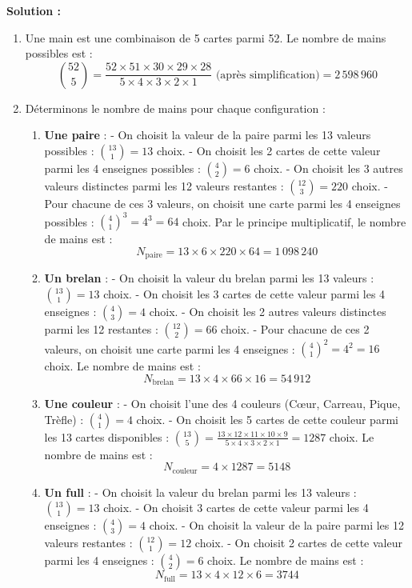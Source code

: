 \textbf{Solution :}
\begin{enumerate}
    \item Une main est une combinaison de 5 cartes parmi 52. Le nombre de mains possibles est :
    \[
    \binom{52}{5} = \frac{52 \times 51 \times 30 \times 29 \times 28}{5 \times 4 \times 3 \times 2 \times 1} \text{ (après simplification)} = 2\,598\,960
    \]
    
    \item Déterminons le nombre de mains pour chaque configuration :
    \begin{enumerate}
        \item \textbf{Une paire} :
        - On choisit la valeur de la paire parmi les 13 valeurs possibles : $\binom{13}{1} = 13$ choix.
        - On choisit les 2 cartes de cette valeur parmi les 4 enseignes possibles : $\binom{4}{2} = 6$ choix.
        - On choisit les 3 autres valeurs distinctes parmi les 12 valeurs restantes : $\binom{12}{3} = 220$ choix.
        - Pour chacune de ces 3 valeurs, on choisit une carte parmi les 4 enseignes possibles : $\binom{4}{1}^3 = 4^3 = 64$ choix.
        Par le principe multiplicatif, le nombre de mains est :
        \[
        N_{\text{paire}} = 13 \times 6 \times 220 \times 64 = 1\,098\,240
        \]
        
        \item \textbf{Un brelan} :
        - On choisit la valeur du brelan parmi les 13 valeurs : $\binom{13}{1} = 13$ choix.
        - On choisit les 3 cartes de cette valeur parmi les 4 enseignes : $\binom{4}{3} = 4$ choix.
        - On choisit les 2 autres valeurs distinctes parmi les 12 restantes : $\binom{12}{2} = 66$ choix.
        - Pour chacune de ces 2 valeurs, on choisit une carte parmi les 4 enseignes : $\binom{4}{1}^2 = 4^2 = 16$ choix.
        Le nombre de mains est :
        \[
        N_{\text{brelan}} = 13 \times 4 \times 66 \times 16 = 54\,912
        \]
        
        \item \textbf{Une couleur} :
        - On choisit l'une des 4 couleurs (Cœur, Carreau, Pique, Trèfle) : $\binom{4}{1} = 4$ choix.
        - On choisit les 5 cartes de cette couleur parmi les 13 cartes disponibles : $\binom{13}{5} = \frac{13 \times 12 \times 11 \times 10 \times 9}{5 \times 4 \times 3 \times 2 \times 1} = 1287$ choix.
        Le nombre de mains est :
        \[
        N_{\text{couleur}} = 4 \times 1287 = 5148
        \]
        
        \item \textbf{Un full} :
        - On choisit la valeur du brelan parmi les 13 valeurs : $\binom{13}{1} = 13$ choix.
        - On choisit 3 cartes de cette valeur parmi les 4 enseignes : $\binom{4}{3} = 4$ choix.
        - On choisit la valeur de la paire parmi les 12 valeurs restantes : $\binom{12}{1} = 12$ choix.
        - On choisit 2 cartes de cette valeur parmi les 4 enseignes : $\binom{4}{2} = 6$ choix.
        Le nombre de mains est :
        \[
        N_{\text{full}} = 13 \times 4 \times 12 \times 6 = 3744
        \]
        

\end{enumerate}
\end{enumerate}

